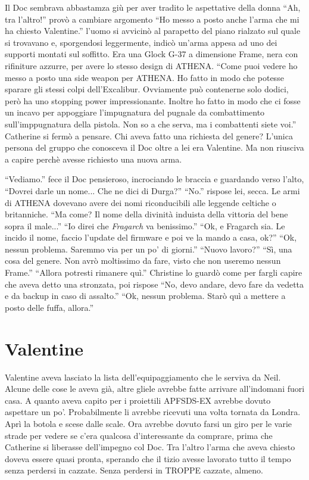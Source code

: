     Il Doc sembrava abbastamza giù per aver tradito le aspettative della donna ``Ah, tra l'altro!'' provò a cambiare
    argomento ``Ho messo a posto anche l'arma che mi ha chiesto Valentine.'' l'uomo si avvicinò al parapetto del piano
    rialzato sul quale si trovavano e, sporgendosi leggermente, indicò un'arma appesa ad uno dei supporti montati sul
    soffitto. Era una Glock G-37 a dimensione Frame, nera con rifiniture azzurre, per avere lo stesso design di ATHENA.
    ``Come puoi vedere ho messo a posto una side weapon per ATHENA. Ho fatto in modo che potesse sparare gli stessi
    colpi dell'Excalibur. Ovviamente può contenerne solo dodici, però ha uno stopping power impressionante. Inoltre ho
    fatto in modo che ci fosse un incavo per appoggiare l'impugnatura del pugnale da combattimento sull'imppugnatura
    della pistola. Non so a che serva, ma i combattenti siete voi.'' Catherine si fermò a pensare. Chi aveva fatto una
    richiesta del genere? L'unica persona del gruppo che conosceva il Doc oltre a lei era Valentine. Ma non riusciva a
    capire perchè avesse richiesto una nuova arma.

    ``Vediamo.'' fece il Doc pensieroso, incrociando le braccia e guardando verso l'alto, ``Dovrei darle un nome... Che
    ne dici di Durga?'' ``No.'' rispose lei, secca. Le armi di ATHENA dovevano avere dei nomi riconducibili alle
    leggende celtiche o britanniche. ``Ma come? Il nome della divinità induista della vittoria del bene sopra il
    male...'' ``Io direi che \emph{Fragarch} va benissimo.'' ``Ok, e Fragarch sia. Le incido il nome, faccio l'update
    del firmware e poi ve la mando a casa, ok?'' ``Ok, nessun problema. Saremmo via per un po' di giorni.'' ``Nuovo
    lavoro?'' ``Sì, una cosa del genere. Non avrò moltissimo da fare, visto che non useremo nessun Frame.'' ``Allora
    potresti rimanere quì.'' Christine lo guardò come per fargli capire che aveva detto una stronzata, poi rispose ``No,
    devo andare, devo fare da vedetta e da backup in caso di assalto.'' ``Ok, nessun problema. Starò quì a mettere a
    posto delle fuffa, allora.''

  \section*{Valentine}

    Valentine aveva lasciato la lista dell'equipaggiamento che le serviva da Neil. Alcune delle cose le aveva già, altre
    gliele avrebbe fatte arrivare all'indomani fuori casa. A quanto aveva capito per i proiettili APFSDS-EX avrebbe
    dovuto aspettare un po'. Probabilmente li avrebbe ricevuti una volta tornata da Londra. Aprì la botola e scese dalle
    scale. Ora avrebbe dovuto farsi un giro per le varie strade per vedere se c'era qualcosa d'interessante da comprare,
    prima che Catherine si liberasse dell'impegno col Doc. Tra l'altro l'arma che aveva chiesto doveva essere quasi
    pronta, sperando che il tizio avesse lavorato tutto il tempo senza perdersi in cazzate. Senza perdersi in TROPPE
    cazzate, almeno.

